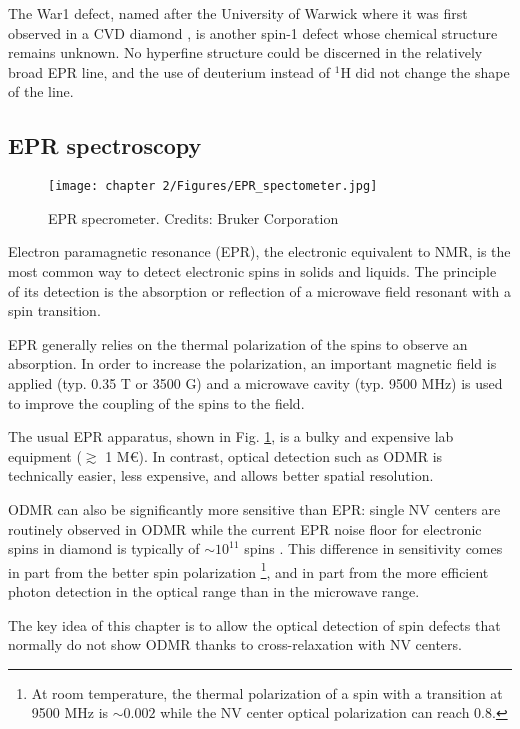 \documentclass[a4paper, 11pt]{report}
\begin{document}
The War1 defect, named after the University of Warwick where it was first observed in a CVD diamond \citep{cruddace2007magnetic}, is another spin-1 defect whose chemical structure remains unknown. No hyperfine structure could be discerned in the relatively broad EPR line, and the use of deuterium instead of $^1$H did not change the shape of the line.

\subsection{EPR spectroscopy}
\begin{figure}[h!]
\centering
\texttt{[image: chapter 2/Figures/EPR\_spectometer.jpg]}
\caption{EPR specrometer. Credits: Bruker Corporation} 
\label{photo EPR}
\end{figure}

Electron paramagnetic resonance (EPR), the electronic equivalent to NMR, is the most common way to detect electronic spins in solids and liquids. The principle of its detection is the absorption or reflection of a microwave field resonant with a spin transition.

EPR generally relies on the thermal polarization of the spins to observe an absorption. In order to increase the polarization, an important magnetic field is applied (typ. 0.35 T or 3500 G) and a microwave cavity (typ. 9500 MHz) is used to improve the coupling of the spins to the field.

The usual EPR apparatus, shown in Fig. \ref{photo EPR}, is a bulky and expensive lab equipment ($\gtrsim$ 1 M€). In contrast, optical detection such as ODMR is technically easier, less expensive, and allows better spatial resolution. 

ODMR can also be significantly more sensitive than EPR: single NV centers are routinely observed in ODMR while the current EPR noise floor for electronic spins in diamond is typically of $\sim 10^{11}$ spins \citep{mitchell2013x}. This difference in sensitivity comes in part from the better spin polarization \footnote{At room temperature, the thermal polarization of a spin with a transition at 9500 MHz is $\sim 0.002$ while the NV center optical polarization can reach 0.8.}, and in part from the more efficient photon detection in the optical range than in the microwave range.

The key idea of this chapter is to allow the optical detection of spin defects that normally do not show ODMR thanks to cross-relaxation with NV centers.
\end{document}
